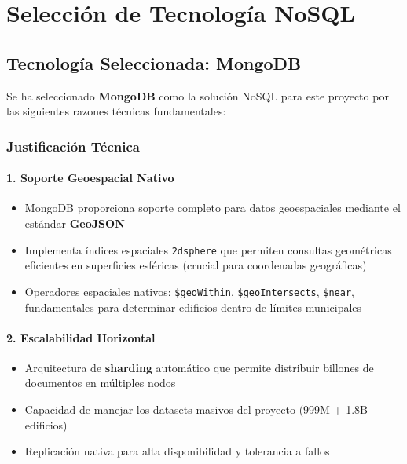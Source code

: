 \documentclass[12pt,a4paper]{article}
\begin{document}
\newpage
\section{Selección de Tecnología NoSQL}

\subsection{Tecnología Seleccionada: MongoDB}

Se ha seleccionado \textbf{MongoDB} como la solución NoSQL para este proyecto por las siguientes razones técnicas fundamentales:

\subsubsection{Justificación Técnica}

\paragraph{1. Soporte Geoespacial Nativo}
\begin{itemize}[leftmargin=*]
    \item MongoDB proporciona soporte completo para datos geoespaciales mediante el estándar \textbf{GeoJSON}
    \item Implementa índices espaciales \texttt{2dsphere} que permiten consultas geométricas eficientes en superficies esféricas (crucial para coordenadas geográficas)
    \item Operadores espaciales nativos: \texttt{\$geoWithin}, \texttt{\$geoIntersects}, \texttt{\$near}, fundamentales para determinar edificios dentro de límites municipales
\end{itemize}

\paragraph{2. Escalabilidad Horizontal}
\begin{itemize}[leftmargin=*]
    \item Arquitectura de \textbf{sharding} automático que permite distribuir billones de documentos en múltiples nodos
    \item Capacidad de manejar los datasets masivos del proyecto (999M + 1.8B edificios)
    \item Replicación nativa para alta disponibilidad y tolerancia a fallos
\end{itemize}
\end{document}
